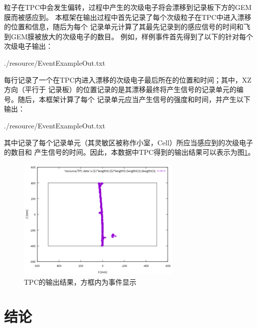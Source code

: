 \documentclass[bachelor,openany,oneside,color]{buaathesis}
\begin{document}
粒子在TPC中会发生偏转，过程中产生的次级电子将会漂移到记录板下方的GEM膜而被感应到。
本框架在输出过程中首先记录了每个次级粒子在TPC中进入漂移的位置和信息，随后为每个
记录单元计算了其最先记录到的感应信号的时间和飞到GEM膜被放大的次级电子的数目。
例如，样例事件首先得到了以下的针对每个次级电子输出：


{./resource/EventExampleOut.txt}

每行记录了一个在TPC内进入漂移的次级电子最后所在的位置和时间；其中，XZ方向（平行于
记录板）的位置记录的是其漂移最终将产生信号的记录单元的编号。随后，本框架计算了每个
记录单元应当产生信号的强度和时间，并产生以下输出：


{./resource/EventExampleOut.txt}

其中记录了每个记录单元（其灵敏区被称作小室，Cell）所应当感应到的次级电子的数目和
产生信号的时间。因此，本数据中TPC得到的输出结果可以表示为图\ref{fig:result:TPC}。

\begin{figure}
	\centering
	\includegraphics[width=0.7\textwidth]{./resource/TPC-result.png}
	\caption{TPC的输出结果，方框内为事件显示}\label{fig:result:TPC}
\end{figure}


\chapter*{结论}



%
\printbibliography[heading=bibintoc,title={参考文献}]

\appendix
%
%
\end{document}
